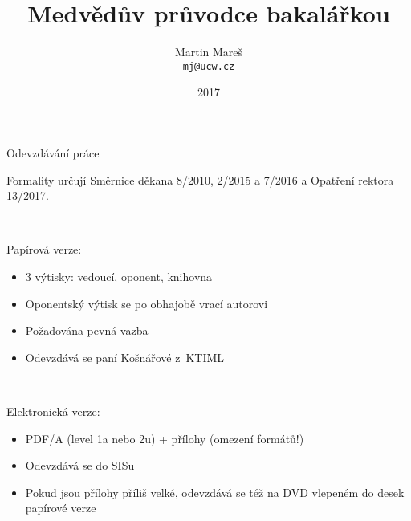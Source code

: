 \documentclass{beamer}
\title[Medvědův průvodce bakalářkou]{Medvědův průvodce bakalářkou}
\author[Martin Mareš]{Martin Mareš\\\texttt{mj@ucw.cz}}
\institute{Katedra Aplikované Matematiky\\MFF UK Praha}
\date{2017}
\begin{document}

\begin{frame}
\titlepage
\end{frame}

\begin{frame}{Odevzdávání práce}

Formality určují Směrnice děkana 8/2010, 2/2015 a 7/2016
a Opatření rektora 13/2017.

~

Papírová verze:

\begin{itemize}
\item 3 výtisky: vedoucí, oponent, knihovna
\item Oponentský výtisk se po obhajobě vrací autorovi
\item Požadována pevná vazba
\item Odevzdává se paní Košnářové z~KTIML
\end{itemize}

~

Elektronická verze:

\begin{itemize}
\item PDF/A (level 1a nebo 2u) + přílohy (omezení formátů!)
\item Odevzdává se do SISu
\item Pokud jsou přílohy příliš velké, odevzdává se též
      na DVD vlepeném do desek papírové verze
\end{itemize}

\end{frame}
\end{document}
